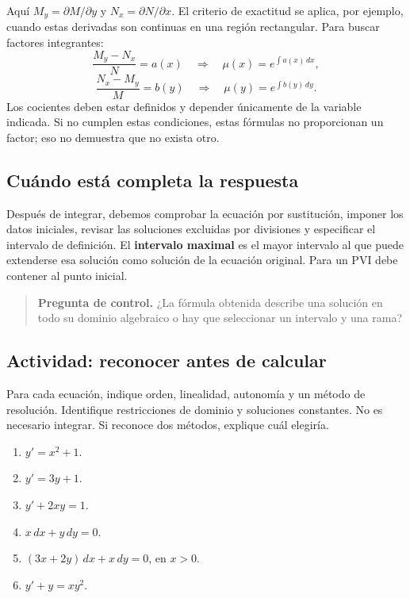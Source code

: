\documentclass[12pt,a4paper]{article}
\begin{document}
	Aquí \(M_y=\partial M/\partial y\) y \(N_x=\partial N/\partial x\). El criterio de exactitud se aplica, por ejemplo, cuando estas derivadas son continuas en una región rectangular. Para buscar factores integrantes:
	\[
	\frac{M_y-N_x}{N}=a(x)
	\quad\Longrightarrow\quad
	\mu(x)=e^{\int a(x)\,dx},
	\]
	\[
	\frac{N_x-M_y}{M}=b(y)
	\quad\Longrightarrow\quad
	\mu(y)=e^{\int b(y)\,dy}.
	\]
	Los cocientes deben estar definidos y depender únicamente de la variable indicada. Si no cumplen estas condiciones, estas fórmulas no proporcionan un factor; eso no demuestra que no exista otro.

	\subsection{Cuándo está completa la respuesta}

	Después de integrar, debemos comprobar la ecuación por sustitución, imponer los datos iniciales, revisar las soluciones excluidas por divisiones y especificar el intervalo de definición. El \textbf{intervalo maximal} es el mayor intervalo al que puede extenderse esa solución como solución de la ecuación original. Para un PVI debe contener al punto inicial.

	\begin{quote}
		\textbf{Pregunta de control.} ¿La fórmula obtenida describe una solución en todo su dominio algebraico o hay que seleccionar un intervalo y una rama?
	\end{quote}

	\clearpage
	\subsection{Actividad: reconocer antes de calcular}

	Para cada ecuación, indique orden, linealidad, autonomía y un método de resolución. Identifique restricciones de dominio y soluciones constantes. No es necesario integrar. Si reconoce dos métodos, explique cuál elegiría.

	\begin{enumerate}[label=\alph*)]
		\item \(y'=x^2+1\).
		\item \(y'=3y+1\).
		\item \(y'+2xy=1\).
		\item \(x\,dx+y\,dy=0\).
		\item \((3x+2y)\,dx+x\,dy=0\), en \(x>0\).
		\item \(y'+y=xy^2\).
	\end{enumerate}
\end{document}
